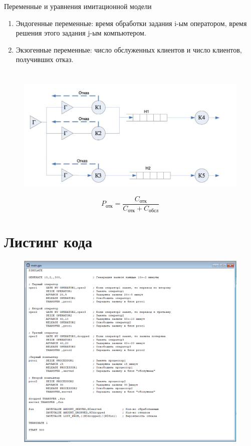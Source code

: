 \documentclass[12pt,a4paper,oneside]{report}
\begin{document}
\quad Переменные и уравнения имитационной модели 
\begin{enumerate} 
  \item Эндогенные переменные: время обработки задания i-ым оператором, время решения этого задания j-ым компьютером.
  \item Экзогенные переменные: число обслуженных клиентов и число клиентов, получивших отказ.
\end{enumerate}

\newpage
\section*{}
\begin{figure}[!h]
	\centering
	\includegraphics[scale=0.6]{teor_2.jpg}
	\label{fig:screenshot002}
\end{figure}

\begin{equation}
    P_{\text{отк}} = \frac{C_{\text{отк}}}{C_{\text{отк}} + C_{\text{обсл}}}  
\end{equation}

\newpage
\section*{Листинг кода}
\begin{figure}[!h]
	\centering
	\includegraphics[scale=0.8]{listing.png}
	\label{fig:screenshot003}
\end{figure}
\end{document}

